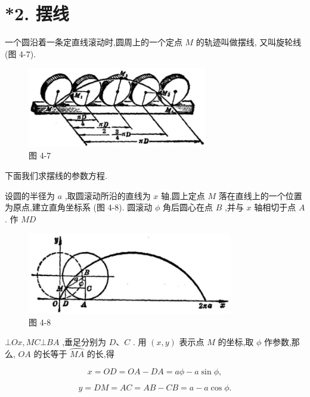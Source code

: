 \documentclass[lang=cn,newtx,10.5pt,scheme=chinese]{elegantbook}
\begin{document}
\section*{*2. 摆线}

一个圆沿着一条定直线滚动时,圆周上的一个定点 \(M\) 的轨迹叫做摆线, 又叫旋轮线 (图 4-7).

\begin{figure}[h]
  \centering
  \includegraphics[max width=0.7\textwidth]{images/01912cc2-ffb6-728e-9ae7-b113ff05c64b_169_676481.jpg}
  \caption{图 4-7}
\end{figure}



下面我们求摆线的参数方程.

设圆的半径为 \(a\) ,取圆滚动所沿的直线为 \(x\) 轴,圆上定点 \(M\) 落在直线上的一个位置为原点,建立直角坐标系 (图 4-8). 圆滚动 \(\phi\) 角后圆心在点 \(B\) ,并与 \(x\) 轴相切于点 \(A\) . 作 \({MD}\)

\begin{figure}[h]
  \centering
  \includegraphics[max width=0.8\textwidth]{images/01912cc2-ffb6-728e-9ae7-b113ff05c64b_169_875701.jpg}
  \caption{图 4-8}
\end{figure}



\(\bot {Ox},{MC} \bot {BA}\) ,垂足分别为 \(D\text{、}C\) . 用 \(\left( {x,y}\right)\) 表示点 \(M\) 的坐标,取 \(\phi\) 作参数,那么, \({OA}\) 的长等于 \(\overset{⏜}{MA}\) 的长,得

\[
  x = {OD} = {OA} - {DA} = {a\phi } - a\sin \phi ,
\]

\[
  y = {DM} = {AC} = {AB} - {CB} = a - a\cos \phi .
\]
\end{document}
